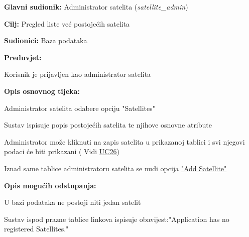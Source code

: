  \noindent {}
			\begin{packed_item}
				
				\item \textbf{Glavni sudionik: }Administrator satelita (\textit{satellite\_admin})
				\item  \textbf{Cilj: }Pregled liste već postojećih satelita
				\item  \textbf{Sudionici: }Baza podataka
				\item  \textbf{Preduvjet: }
				\begin{packed_enum}
					\item Korisnik je prijavljen kao administrator satelita	\end{packed_enum}
				\item  \textbf{Opis osnovnog tijeka: }
				
				\item[] \begin{packed_enum}
					
					\item Administrator satelita odabere opciju "Satellites"
					\item Sustav ispisuje popis postojećih satelita te njihove osnovne atribute 
					\item Administrator može kliknuti na zapis satelita u prikazanoj tablici i svi njegovi podaci će biti prikazani ( Vidi \hyperref[UC26] {UC26})
					\item Iznad same tablice administratoru satelita se nudi opcija \hyperref[UC20]{ "Add Satellite"}
					
				\end{packed_enum}
				
				\item  \textbf{Opis mogućih odstupanja: }
				
				\item[] \begin{packed_enum}
					
					\item[1] U bazi podataka ne postoji niti jedan satelit
					\item[ ] \begin{packed_enum}
						
						\item[1.1] Sustav ispod prazne tablice linkova ispisuje obavijest:\newline "Application has no registered Satellites." 
					\end{packed_enum}
				\end{packed_enum}
			\end{packed_item}
